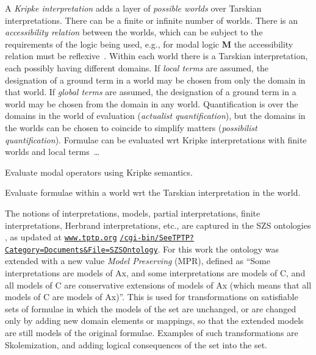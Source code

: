 \documentclass{easychair}
\newenvironment{packed_itemize}{
\vspace*{-0.3em}
\begin{itemize}
\setlength{\partopsep}{0pt}
\setlength{\itemsep}{1pt}
\setlength{\parskip}{0pt}
\setlength{\parsep}{0pt}
}{\end{itemize}}
\begin{document}
A \emph{Kripke interpretation} \cite{Kri63} adds a layer of \emph{possible worlds} over Tarskian 
interpretations.
There can be a finite or infinite number of worlds.
There is an \emph{accessibility relation} between the worlds, which can be subject to the
requirements of the logic being used, e.g., for modal logic \textbf{M} the accessibility 
relation must be reflexive~\cite{Gar18}.
Within each world there is a Tarskian interpretation, each possibly having different domains.
If \emph{local terms} are assumed, the designation of a ground term in a world may be chosen 
from only the domain in that world. 
If \emph{global terms} are assumed, the designation of a ground term in a world may be chosen 
from the domain in any world.
Quantification is over the domains in the world of evaluation (\emph{actualist quantification}), 
but the domains in the worlds can be chosen to coincide to simplify matters (\emph{possibilist 
quantification}).
Formulae can be evaluated wrt Kripke interpretations with finite worlds and local terms~\ldots
\begin{packed_itemize}
\item Evaluate modal operators using Kripke semantics.
\item Evaluate formulae within a world wrt the Tarskian interpretation in the world.
\end{packed_itemize}

The notions of interpretations, models, partial interpretations, finite interpretations,
Herbrand interpretations, etc., are captured in the SZS ontologies \cite{Sut08-KEAPPA}, as
updated at 
\href{https://www.tptp.org/cgi-bin/SeeTPTP?Category=Documents\&File=SZSOntology}{\tt www.tptp.org}
\href{https://www.tptp.org/cgi-bin/SeeTPTP?Category=Documents\&File=SZSOntology}{\tt /cgi-bin/SeeTPTP?Category=Documents\&File=SZSOntology}.
For this work the ontology was extended with a new value \emph{Model Preserving} (MPR), defined
as ``Some interpretations are models of Ax, and
  some interpretations are models  of C, and
  all models of C are conservative extensions of models of Ax
  (which means that all models of C are models of Ax)''.
This is used for transformations on satisfiable sets of formulae in which the models of the set 
are unchanged, or are changed only by adding new domain elements or mappings, so that the
extended models are still models of the original formulae. 
Examples of such transformations are Skolemization, and adding logical consequences of the set 
into the set.

\end{document}
